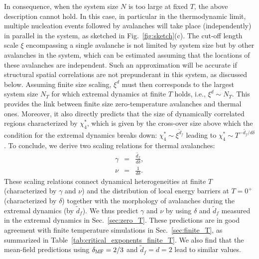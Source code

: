 \documentclass[pre,twocolumn,superscriptaddress,tightenlines,showpacs,longbibliography,floatfix,footinbib]{revtex4-1}
\begin{document}
In consequence, when the system size $N$ is too large at fixed $T$, the above description cannot hold. In this case, in particular in the thermodynamic limit, multiple nucleation events followed by avalanches will take place (independently) in parallel in the system, as sketched in Fig.~\ref{fig:sketch}(c). The cut-off length scale $\xi$ encompassing a single avalanche is not limited by system size but by other avalanches in the system, which can be estimated assuming that the locations of these avalanches are independent. Such an approximation will be accurate if structural spatial correlations are not prepunderant in this system, as discussed below. Assuming finite size scaling, $\xi^{d}$ must then corresponds to the largest system size $N_T$ for which extremal dynamics at finite $T$ holds, i.e., $\xi^{d} \sim N_T$. This provides the link between finite size zero-temperature avalanches and thermal ones. Moreover, it also directly predicts that the size of dynamically correlated regions characterized by $\chi_4^*$, which is given by the cross-over size above which the condition for the extremal dynamics breaks down: $\chi_4^* \sim \xi^{\tilde d_f}$ leading to $\chi_4^* \sim T^{-\tilde{d_f}/d\delta}$.
To conclude, we derive two scaling relations for thermal avalanches:
\begin{eqnarray}
    \gamma &=& \frac{\tilde{d_f}}{d \delta} ,\\
    \nu &=& \frac{1}{d \delta} .
    \label{eq:3}
\end{eqnarray}
These scaling relations connect dynamical heterogeneities at finite $T$ (characterized by $\gamma$ and $\nu$) and the distribution of local energy barriers at $T=0^+$ (characterized by $\delta$) together with the morphology of avalanches  during the extremal dynamics (by $\tilde d_f$).
We thus predict $\gamma$ and $\nu$ %
by using $\delta$ and $\tilde d_f$ measured in the extremal dynamics in Sec.~\ref{sec:zero_T}. 
These predictions are in good agreement with finite temperature simulations in Sec.~\ref{sec:finite_T}, as summarized in Table~\ref{tab:critical_exponents_finite_T}. 
We also find that the mean-field predictions %
using $\delta_{\rm MF}=2/3$ and $\tilde d_f=d=2$ lead to similar values.

\end{document}
